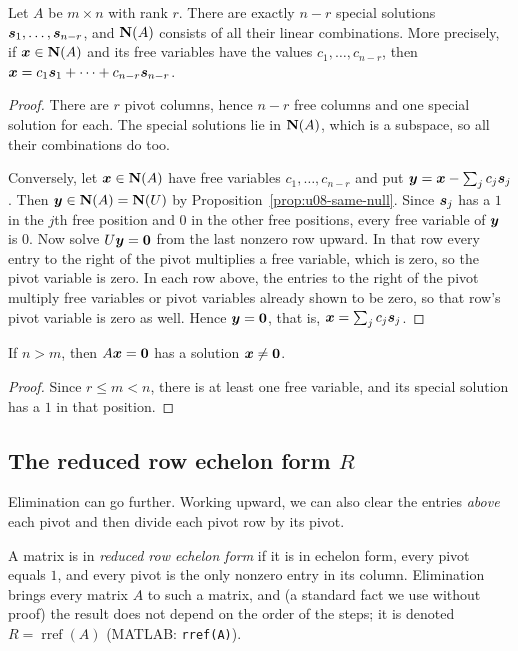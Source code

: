 \begin{theorem}\label{thm:u08-special}
Let $A$ be $m\times n$ with rank $r$. There are exactly $n-r$ special solutions
$\boldsymbol{s}_1,\dots,\boldsymbol{s}_{n-r}$, and $\mathbf{N}(A)$ consists of all their linear combinations. More
precisely, if $\boldsymbol{x}\in\mathbf{N}(A)$ and its free variables have the values $c_1,\dots,c_{n-r}$,
then $\boldsymbol{x}=c_1\boldsymbol{s}_1+\dots+c_{n-r}\boldsymbol{s}_{n-r}$.
\end{theorem}
\begin{proof}
There are $r$ pivot columns, hence $n-r$ free columns and one special solution for each. The
special solutions lie in $\mathbf{N}(A)$, which is a subspace, so all their combinations do too.

Conversely, let $\boldsymbol{x}\in\mathbf{N}(A)$ have free variables $c_1,\dots,c_{n-r}$ and put
$\boldsymbol{y}=\boldsymbol{x}-\sum_j c_j\boldsymbol{s}_j$. Then $\boldsymbol{y}\in\mathbf{N}(A)=\mathbf{N}(U)$ by
Proposition~\ref{prop:u08-same-null}. Since $\boldsymbol{s}_j$ has a $1$ in the $j$th free position and
$0$ in the other free positions, every free variable of $\boldsymbol{y}$ is $0$. Now solve
$U\boldsymbol{y}=\boldsymbol{0}$ from the last nonzero row upward. In that row every entry to the right of the
pivot multiplies a free variable, which is zero, so the pivot variable is zero. In each row above,
the entries to the right of the pivot multiply free variables or pivot variables already shown to
be zero, so that row's pivot variable is zero as well. Hence $\boldsymbol{y}=\boldsymbol{0}$, that is,
$\boldsymbol{x}=\sum_j c_j\boldsymbol{s}_j$.
\end{proof}

\begin{corollary}\label{cor:u08-wide}
If $n>m$, then $A\boldsymbol{x}=\boldsymbol{0}$ has a solution $\boldsymbol{x}\ne\boldsymbol{0}$.
\end{corollary}
\begin{proof}
Since $r\le m<n$, there is at least one free variable, and its special solution has a $1$ in
that position.
\end{proof}

\subsection{The reduced row echelon form \texorpdfstring{\(R\)}{R}}

Elimination can go further. Working upward, we can also clear the entries \emph{above} each pivot
and then divide each pivot row by its pivot.

\begin{definition}\label{def:u08-rref}
A matrix is in \emph{reduced row echelon form} if it is in echelon form, every pivot equals $1$,
and every pivot is the only nonzero entry in its column. Elimination brings every matrix $A$ to
such a matrix, and (a standard fact we use without proof) the result does not depend on the order
of the steps; it is denoted $R=\operatorname{rref}(A)$ (MATLAB: \texttt{rref(A)}).
\end{definition}

